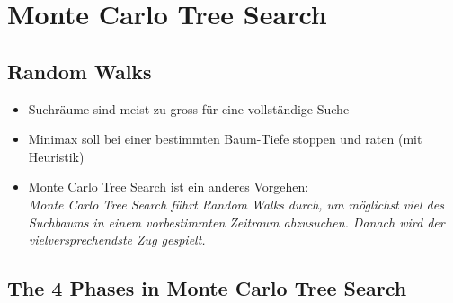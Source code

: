 \documentclass[a4paper]{article}
\begin{document}
	\section{Monte Carlo Tree Search}
	
		\subsection{Random Walks}
		
		\begin{itemize}
			\item Suchräume sind meist zu gross für eine vollständige Suche
			\item Minimax soll bei einer bestimmten Baum-Tiefe stoppen und raten (mit Heuristik)
			\item Monte Carlo Tree Search ist ein anderes Vorgehen: \\
			\textit{Monte Carlo Tree Search führt Random Walks durch, um möglichst viel des Suchbaums in einem vorbestimmten Zeitraum abzusuchen.
			Danach wird der vielversprechendste Zug gespielt.}
		\end{itemize}
	
		\newpage
	
		\subsection{The 4 Phases in Monte Carlo Tree Search}
		
\end{document}
